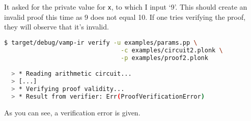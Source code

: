 It asked for the private value for \lstinline{x}, to which I input `9'. This should create an invalid proof this time as 9 does not equal 10. If one tries verifying the proof, they will observe that it's invalid.

\begin{lstlisting}[language=bash]
  $ target/debug/vamp-ir verify -u examples/params.pp \
                                -c examples/circuit2.plonk \
                                -p examples/proof2.plonk

  > * Reading arithmetic circuit...
  > [...]
  > * Verifying proof validity...
  > * Result from verifier: Err(ProofVerificationError)
\end{lstlisting}

As you can see, a verification error is given.